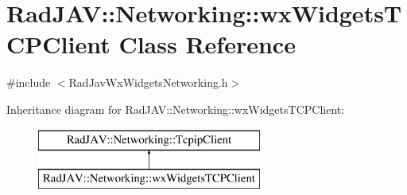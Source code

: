 \hypertarget{class_rad_j_a_v_1_1_networking_1_1wx_widgets_t_c_p_client}{}\section{Rad\+J\+AV\+:\+:Networking\+:\+:wx\+Widgets\+T\+C\+P\+Client Class Reference}
\label{class_rad_j_a_v_1_1_networking_1_1wx_widgets_t_c_p_client}


{\ttfamily \#include $<$Rad\+Jav\+Wx\+Widgets\+Networking.\+h$>$}

Inheritance diagram for Rad\+J\+AV\+:\+:Networking\+:\+:wx\+Widgets\+T\+C\+P\+Client\+:\begin{figure}[H]
\begin{center}
\leavevmode
\includegraphics[height=2.000000cm]{class_rad_j_a_v_1_1_networking_1_1wx_widgets_t_c_p_client}
\end{center}
\end{figure}
